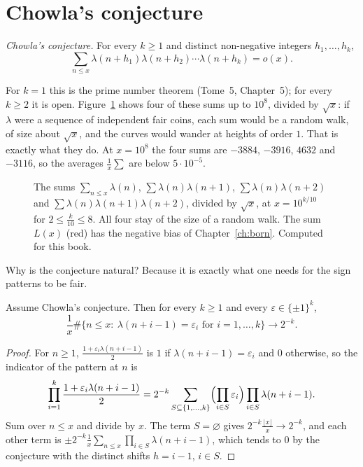 \section{Chowla's conjecture}

\begin{center}
\emph{Chowla's conjecture.} For every $k\ge1$ and distinct non-negative integers $h_1,\dots,h_k$,
\[
\sum_{n\le x}\lambda(n+h_1)\lambda(n+h_2)\cdots\lambda(n+h_k)=o(x).
\]
\end{center}

For $k=1$ this is the prime number theorem (Tome~5, Chapter~5); for every $k\ge2$ it is open. Figure~\ref{fig:chowla} shows four of these sums up to $10^8$,
divided by $\sqrt x$: if $\lambda$ were a sequence of independent fair coins, each sum would be a random walk, of size about $\sqrt x$, and the curves
would wander at heights of order $1$. That is exactly what they do. At $x=10^8$ the four sums are $-3884$, $-3916$, $4632$ and $-3116$, so the averages
$\frac1x\sum$ are below $5\cdot10^{-5}$.

\begin{figure}[ht]
\centering
{}
\caption{The sums $\sum_{n\le x}\lambda(n)$, $\sum\lambda(n)\lambda(n+1)$, $\sum\lambda(n)\lambda(n+2)$ and $\sum\lambda(n)\lambda(n+1)\lambda(n+2)$,
divided by $\sqrt x$, at $x=10^{k/10}$ for $2\le\frac k{10}\le8$. All four stay of the size of a random walk. The sum $L(x)$ (red) has the negative bias of
Chapter~\ref{ch:born}. Computed for this book.}
\label{fig:chowla}
\end{figure}

Why is the conjecture natural? Because it is exactly what one needs for the sign patterns to be fair.

\begin{proposition}\label{prop:patterns}
Assume Chowla's conjecture. Then for every $k\ge1$ and every $\varepsilon\in\{\pm1\}^k$,
\[
\frac1x\#\bigl\{n\le x:\ \lambda(n+i-1)=\varepsilon_i\text{ for }i=1,\dots,k\bigr\}\longrightarrow2^{-k}.
\]
\end{proposition}
\begin{proof}
For $n\ge1$, $\frac{1+\varepsilon_i\lambda(n+i-1)}2$ is $1$ if $\lambda(n+i-1)=\varepsilon_i$ and $0$ otherwise, so the indicator of the pattern at $n$ is
\[
\prod_{i=1}^k\frac{1+\varepsilon_i\lambda(n+i-1)}2=2^{-k}\sum_{S\subseteq\{1,\dots,k\}}\Bigl(\prod_{i\in S}\varepsilon_i\Bigr)\prod_{i\in S}\lambda(n+i-1).
\]
Sum over $n\le x$ and divide by $x$. The term $S=\varnothing$ gives $2^{-k}\frac{\lfloor x\rfloor}x\to2^{-k}$, and each other term is $\pm2^{-k}\frac1x\sum_{n\le x}\prod_{i\in S}\lambda(n+i-1)$,
which tends to $0$ by the conjecture with the distinct shifts $h=i-1$, $i\in S$.
\end{proof}

